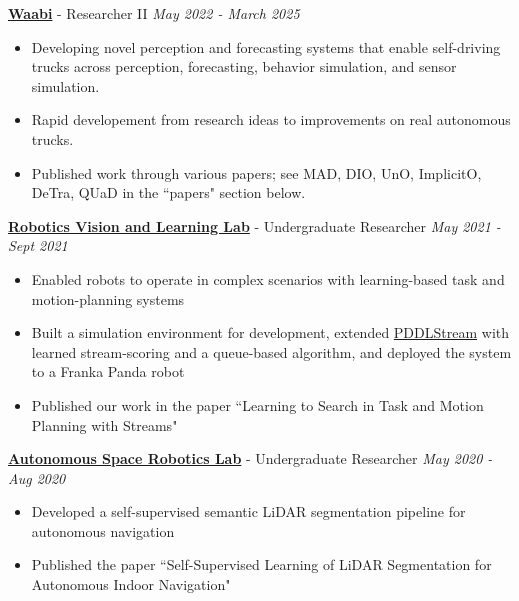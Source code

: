 \documentclass{article}
\newcommand{\tikzrule}[3][]{\tikz{\fill[#1] (0,0) rectangle (#2,#3);}\vspace{0.5em}}
\begin{document}
\noindent{}\textbf{\href{https://waabi.ai/}{Waabi}} - Researcher II \hfill \faCalendar{} \textit{May 2022 - March 2025}
\begin{itemize}[noitemsep, topsep=1mm]
    \item Developing novel perception and forecasting systems that enable self-driving trucks across perception, forecasting, behavior simulation, and sensor simulation.
    \item Rapid developement from research ideas to improvements on real autonomous trucks.
    \item Published work through various papers; see MAD, DIO, UnO, ImplicitO, DeTra, QUaD in the ``papers" section below.
\end{itemize}
\vspace{0.5em}

\noindent{}\textbf{\href{https://rvl.cs.toronto.edu}{Robotics Vision and Learning Lab}} - Undergraduate Researcher \hfill \faCalendar{} \textit{May 2021 - Sept 2021} 
\begin{itemize}[noitemsep, topsep=1mm]
    \item Enabled robots to operate in complex scenarios with learning-based task and motion-planning systems
    \item Built a simulation environment for development, extended \href{https://github.com/caelan/pddlstream}{PDDLStream} with learned stream-scoring and a queue-based algorithm, and deployed the system to a Franka Panda robot
    \item Published our work in the paper ``Learning to Search in Task and Motion Planning with Streams"
\end{itemize}
\vspace{0.5em}

\noindent{}\textbf{\href{http://asrl.utias.utoronto.ca/}{Autonomous Space Robotics Lab}} - Undergraduate Researcher \hfill \faCalendar{} \textit{May 2020 - Aug 2020} 
\begin{itemize}[noitemsep, topsep=1mm]
    \item Developed a self-supervised semantic LiDAR segmentation pipeline for autonomous navigation
    \item Published the paper ``Self-Supervised Learning of LiDAR Segmentation for Autonomous Indoor Navigation"
\end{itemize}

\vspace{0.5em}
\\
\tikzrule[black, path fading=east]{\textwidth}{1pt}
\end{document}

